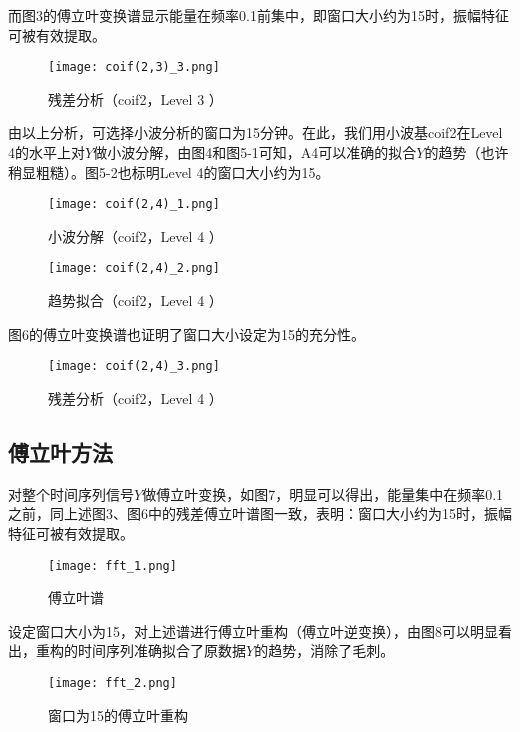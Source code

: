\documentclass[12pt,a4paper]{article}
\begin{document}
而图3的傅立叶变换谱显示能量在频率0.1前集中，即窗口大小约为15时，振幅特征可被有效提取。
\begin{figure}[H]
 \centering
 \texttt{[image: coif(2,3)\_3.png]}\\
 \caption{残差分析（coif2，Level 3 ）\quad}
\end{figure}

由以上分析，可选择小波分析的窗口为15分钟。在此，我们用小波基coif2在Level 4的水平上对$Y$做小波分解，由图4和图5-1可知，A4可以准确的拟合$Y$的趋势（也许稍显粗糙）。图5-2也标明Level 4的窗口大小约为15。
\begin{figure}[H]
 \centering
 \texttt{[image: coif(2,4)\_1.png]}\\
 \caption{小波分解（coif2，Level 4 ）\quad}
\end{figure}

\begin{figure}[H]
 \centering
 \texttt{[image: coif(2,4)\_2.png]}\\
 \caption{趋势拟合（coif2，Level 4 ）\quad}
\end{figure}

图6的傅立叶变换谱也证明了窗口大小设定为15的充分性。
\begin{figure}[H]
 \centering
 \texttt{[image: coif(2,4)\_3.png]}\\
 \caption{残差分析（coif2，Level 4 ）\quad}
\end{figure}

\subsection{傅立叶方法}

对整个时间序列信号$ Y $做傅立叶变换，如图7，明显可以得出，能量集中在频率0.1之前，同上述图3、图6中的残差傅立叶谱图一致，表明：窗口大小约为15时，振幅特征可被有效提取。

\begin{figure}[H]
 \centering
 \texttt{[image: fft\_1.png]}\\
 \caption{傅立叶谱\quad}
\end{figure}

设定窗口大小为15，对上述谱进行傅立叶重构（傅立叶逆变换），由图8可以明显看出，重构的时间序列准确拟合了原数据$ Y $的趋势，消除了毛刺。
\begin{figure}[H]
 \centering
 \texttt{[image: fft\_2.png]}\\
 \caption{窗口为15的傅立叶重构\quad}
\end{figure}
\end{document}
